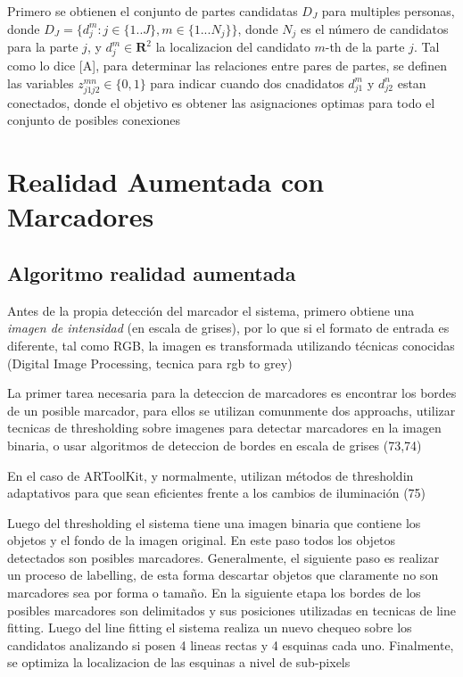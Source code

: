 \documentclass[runningheads]{llncs}
\begin{document}
Primero se obtienen el conjunto de partes candidatas $\textit{D}_\textit{J}$ para multiples personas, donde $\textit{D}_\textit{J} = \{d_j^m: j\in \{1..J\}, m \in \{1...N_j\} \}$, donde $N_j$ es el número de candidatos para la parte $j$, y $d_j^m \in \mathbf{R}^2$ la localizacion del candidato $m$-th de la parte $j$.
Tal como lo dice [A], para determinar las relaciones entre pares de partes, se definen las variables $z_{j1j2}^{mn} \in \{0,1\}$ para indicar cuando dos cnadidatos $d_{j1}^m$ y $d_{j2}^n$ estan conectados, donde el objetivo es obtener las asignaciones optimas para todo el conjunto de posibles conexiones  

\section{Realidad Aumentada con Marcadores}

\subsection{Algoritmo realidad aumentada}

Antes de la propia detección del marcador el sistema, primero obtiene una \textit{imagen de intensidad} (en escala de grises), por lo que si el formato de entrada es diferente, tal como RGB, la imagen es transformada utilizando técnicas conocidas
(Digital Image Processing, tecnica para rgb to grey)

La primer tarea necesaria para la deteccion de marcadores es encontrar los bordes de un posible marcador, para ellos se utilizan comunmente dos approachs, utilizar tecnicas de thresholding sobre imagenes para detectar marcadores en la imagen binaria, o usar algoritmos de deteccion de bordes en escala de grises (73,74)

En el caso de ARToolKit, y normalmente, utilizan métodos de thresholdin adaptativos para que sean eficientes frente a los cambios de iluminación (75)

Luego del thresholding el sistema tiene una imagen binaria que contiene los objetos y el fondo de la imagen original. En este paso todos los objetos detectados son posibles marcadores. Generalmente, el siguiente paso es realizar un proceso de labelling, de esta forma descartar objetos que claramente no son marcadores sea por forma o tamaño.
En la siguiente etapa los bordes de los posibles marcadores son delimitados y sus posiciones utilizadas en tecnicas de line fitting. Luego del line fitting el sistema realiza un nuevo chequeo sobre los candidatos analizando si posen 4 lineas rectas y 4 esquinas cada uno. Finalmente, se optimiza la localizacion de las esquinas a nivel de sub-pixels
\end{document}
